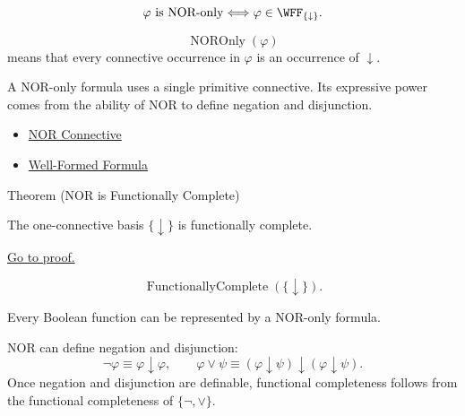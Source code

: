 \begin{remark*}
\[
\varphi\text{ is NOR-only}
\Longleftrightarrow
\varphi\in\WFF_{\{\downarrow\}}.
\]
\end{remark*}

\begin{remark*}
\[
  \operatorname{NOROnly}(\varphi)
\] means that every connective occurrence in
\(\varphi\) is an occurrence of \(\downarrow\).
\end{remark*}

\begin{remark*}[Interpretation]
A NOR-only formula uses a single primitive connective. Its expressive power
comes from the ability of NOR to define negation and disjunction.
\end{remark*}

\begin{dependencies}
\begin{itemize}
  \item \hyperref[def:nor-connective-propositional-logic]{NOR Connective}
  \item \hyperref[def:well-formed-formula]{Well-Formed Formula}
\end{itemize}
\end{dependencies}

\begin{theorembox}{Theorem (NOR is Functionally Complete)}
\begin{theorem}
\label{thm:nor-functionally-complete-propositional-logic}
The one-connective basis \(\{\downarrow\}\) is functionally complete.

\noindent\hyperref[prf:nor-functionally-complete-propositional-logic]{Go to proof.}
\end{theorem}
\end{theorembox}

\begin{remark*}
\[
\operatorname{FunctionallyComplete}(\{\downarrow\}).
\]
\end{remark*}



\begin{remark*}[Interpretation]
Every Boolean function can be represented by a NOR-only formula.

NOR can define negation and disjunction:
\[
\neg\varphi\equiv\varphi\downarrow\varphi,
\qquad
\varphi\lor\psi\equiv(\varphi\downarrow\psi)\downarrow(\varphi\downarrow\psi).
\]
Once negation and disjunction are definable, functional completeness follows
from the functional completeness of \(\{\neg,\lor\}\).
\end{remark*}

